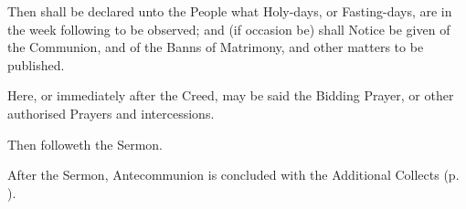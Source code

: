 \begin{rubric}
Then shall be declared unto the People what Holy-days, or Fasting-days, are in the week following to be observed; and (if occasion be) shall Notice be given of the Communion, and of the Banns of Matrimony, and other matters to be published.
\end{rubric}

\begin{rubric}
Here, or immediately after the Creed, may be said the Bidding Prayer, or other authorised Prayers and intercessions.
\end{rubric}

\begin{rubric}
	Then followeth the Sermon.
\end{rubric}

\begin{rubric}
	After the Sermon, Antecommunion is concluded with the Additional Collects (p. \pageref{AdditionalCollects}).
\end{rubric}
